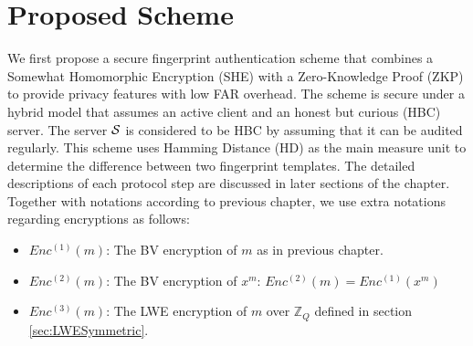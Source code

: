 \section{Proposed Scheme}
We first propose a secure fingerprint authentication scheme that combines a
Somewhat Homomorphic Encryption (SHE) with a Zero-Knowledge Proof (ZKP) to
provide privacy features with low FAR overhead. The scheme is secure under a
hybrid model that assumes an active client and an honest but curious (HBC)
server. The server $\mathcal{S}$ is considered to be HBC by assuming that it can be
audited regularly. This scheme uses Hamming Distance (HD) as the main measure
unit to determine the difference between two fingerprint templates. The detailed
descriptions of each protocol step are discussed in later sections of the
chapter. Together with notations according to previous chapter, we use extra notations regarding encryptions as follows:
\begin{itemize}
\item $Enc^{(1)}(m)$: The BV encryption of $m$ as in previous chapter.
\item $Enc^{(2)}(m)$: The BV encryption of $x^{m}$: $Enc^{(2)}(m) = Enc^{(1)}(x^{m})$
\item $Enc^{(3)}(m)$: The LWE encryption of $m$ over $\mathbb{Z}_{Q}$ defined in section \ref{sec:LWESymmetric}.
\end{itemize}

